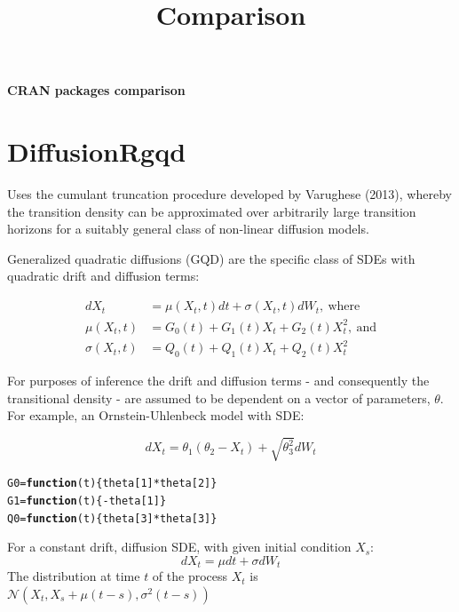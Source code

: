 \documentclass[a4paper,11pt]{article}\usepackage[]{graphicx}\usepackage[]{color}
\makeatletter
\newcommand{\hlnum}[1]{\textcolor[rgb]{0.686,0.059,0.569}{#1}}%
\newcommand{\hlopt}[1]{\textcolor[rgb]{0,0,0}{#1}}%
\newcommand{\hlstd}[1]{\textcolor[rgb]{0.345,0.345,0.345}{#1}}%
\newcommand{\hlkwa}[1]{\textcolor[rgb]{0.161,0.373,0.58}{\textbf{#1}}}%
\newcommand{\hlkwb}[1]{\textcolor[rgb]{0.69,0.353,0.396}{#1}}%
\newcommand{\hlkwc}[1]{\textcolor[rgb]{0.333,0.667,0.333}{#1}}%
\newenvironment{kframe}{%
 \def\at@end@of@kframe{}%
 \ifinner\ifhmode%
  \def\at@end@of@kframe{\end{minipage}}%
  \begin{minipage}{\columnwidth}%
 \fi\fi%
 \def\FrameCommand##1{\hskip\@totalleftmargin \hskip-\fboxsep
 \colorbox{shadecolor}{##1}\hskip-\fboxsep
     \hskip-\linewidth \hskip-\@totalleftmargin \hskip\columnwidth}%
 \MakeFramed {\advance\hsize-\width
   \@totalleftmargin\z@ \linewidth\hsize
   \@setminipage}}%
 {\par\unskip\endMakeFramed%
 \at@end@of@kframe}
\newenvironment{knitrout}{}{} %
\makeatother
\begin{document}
\pagestyle{empty}
\title{Comparison}
\begin{center}
\Large\textbf{CRAN packages comparison} \\[11pt]
\normalsize
\end{center}

\section{DiffusionRgqd}
Uses the cumulant truncation procedure developed by Varughese (2013), whereby the transition density can be approximated over arbitrarily large transition horizons for a suitably general class of non-linear diffusion models.

Generalized quadratic diffusions (GQD) are the specific class of SDEs with quadratic drift and diffusion terms:

\begin{align*}
d X_t & = \mu(X_t, t)dt + \sigma(X_t, t)dW_t, \: \text{where} \\
\mu(X_t, t) & = G_0(t) + G_1(t) X_t + G_2(t) X_t^2, \: \text{and} \\
\sigma (X_t, t) & = Q_0(t) + Q_1(t) X_t + Q_2(t) X_t^2
\end{align*}

For purposes of inference the drift and diffusion terms - and consequently the transitional density - are assumed to be dependent on a vector of parameters, $\theta$. For example, an Ornstein-Uhlenbeck model with SDE:

\begin{equation}
d X_t = \theta_1 (\theta_2 - X_t) + \sqrt{\theta_3^2} dW_t
\end{equation}

\begin{knitrout}
\color{fgcolor}\begin{kframe}
\begin{alltt}
\hlstd{G0}\hlkwb{=}\hlkwa{function}\hlstd{(}\hlkwc{t}\hlstd{)\{theta[}\hlnum{1}\hlstd{]}\hlopt{*}\hlstd{theta[}\hlnum{2}\hlstd{]\}}
\hlstd{G1}\hlkwb{=}\hlkwa{function}\hlstd{(}\hlkwc{t}\hlstd{)\{}\hlopt{-}\hlstd{theta[}\hlnum{1}\hlstd{]\}}
\hlstd{Q0}\hlkwb{=}\hlkwa{function}\hlstd{(}\hlkwc{t}\hlstd{)\{theta[}\hlnum{3}\hlstd{]}\hlopt{*}\hlstd{theta[}\hlnum{3}\hlstd{]\}}
\end{alltt}
\end{kframe}
\end{knitrout}

For a constant drift, diffusion SDE, with given initial condition $X_s$:
\begin{equation}
dX_t = \mu dt + \sigma dW_t
\end{equation}
The distribution at time $t$ of the process $X_t$ is $\mathcal{N}(X_t, X_s + \mu(t-s), \sigma^2(t-s))$
\end{document}
